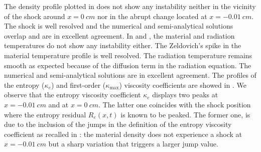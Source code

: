 \documentclass[times,doublespace]{fldauth}%
\begin{document}
%
The density profile plotted in  does not show any instability neither in the vicinity of the shock around $x = 0 \ cm$ nor in the abrupt change located at $x = -0.01 \ cm$. The shock is well resolved and the numerical and semi-analytical solutions overlap and are in excellent agreement.
In  and , the material and radiation temperatures do not show any instability either. The Zeldovich's spike in the material temperature profile is well resolved. The radiation temperature remains smooth as expected because of the diffusion term in the radiation equation. The numerical and semi-analytical solutions are in excellent agreement. 
The profiles of the entropy ($\kappa_e$) and first-order ($\kappa_\text{max}$) viscosity coefficients are showed in . We observe that the entropy viscosity coefficient $\kappa_e$ displays two peaks at $x=-0.01 \ cm$ and at $x = 0 \ cm$. The latter one coincides with the shock position where the entropy residual $R_e(x,t)$ is known to be peaked. %
The former one, is due to the inclusion of the jumps in the definition of the entropy viscosity coefficient as recalled in : the material density does not experience a shock at $x=-0.01 \ cm$ but a sharp variation that triggers a larger jump value. 
\end{document}
